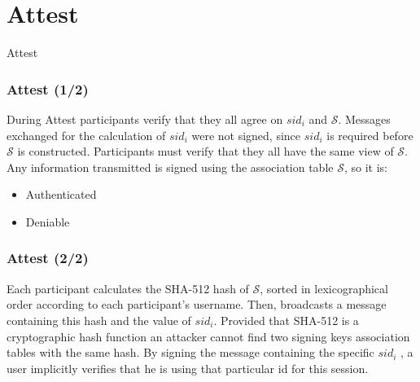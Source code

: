 \section{Attest}

\begin{frame}
\Huge{\centerline{Attest}}
\end{frame}

\begin{frame}
  \frametitle{Attest (1/2)}
  
  During Attest participants verify that they all agree on $sid_i$ and $\mathcal{S}$.
  \vfill
  Messages exchanged for the calculation of $sid_i$ were not signed, since $sid_i$ is required before $\mathcal{S}$ is constructed.
  \vfill
  Participants must verify that they all have the same view of $\mathcal{S}$.\\[0.3cm]
  \vfill
  Any information transmitted is signed using the association table $\mathcal{S}$, so it is:
  \begin{itemize}
    \item Authenticated
    \item Deniable
  \end{itemize}
  
\end{frame}

\begin{frame}
 \frametitle{Attest (2/2)}
 
  Each participant calculates the SHA-512 hash of $\mathcal{S}$, sorted in lexicographical order according to each participant's username.
  \vfill
  Then, broadcasts a message containing this hash and the value of $sid_i$.
  \vfill
  Provided that SHA-512 is a cryptographic hash function an attacker cannot find two signing keys association tables with the same hash.
  \vfill
  By signing the message containing the specific $sid_i$ , a user implicitly verifies that he is using that particular id for this session.
  
\end{frame}